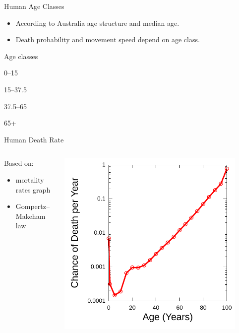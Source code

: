\documentclass{beamer}
\begin{document}
\begin{frame}{Human Age Classes}
    \begin{itemize}
        \item According to Australia age structure and median age.
        \item Death probability and movement speed depend on age class.
    \end{itemize}

    \begin{block}{Age classes}
        \begin{description}
            \item[Child] 0--15
            \item[Young] 15--37.5
            \item[Middle age] 37.5--65
            \item[Elderly] 65+
        \end{description}
    \end{block}
\end{frame}

\begin{frame}{Human Death Rate}
    \begin{columns}
        \begin{column}{0.5\textwidth}
            Based on:
            \begin{itemize}
                \item mortality rates graph
                \item Gompertz–Makeham law
            \end{itemize}
        \end{column}
        \begin{column}{0.5\textwidth}
            \includegraphics[width=0.9\textwidth]{USGompertzCurve}
        \end{column}
    \end{columns}
\end{frame}
\end{document}

